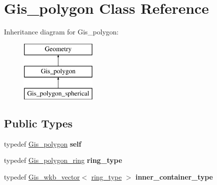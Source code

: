 \hypertarget{classGis__polygon}{}\section{Gis\+\_\+polygon Class Reference}
\label{classGis__polygon}
Inheritance diagram for Gis\+\_\+polygon\+:\begin{figure}[H]
\begin{center}
\leavevmode
\includegraphics[height=3.000000cm]{classGis__polygon}
\end{center}
\end{figure}
\subsection*{Public Types}
\begin{DoxyCompactItemize}
\item 
\mbox{\label{classGis__polygon_ac2a86535224cdabe48dcc9280184d664}} 
typedef \mbox{\hyperlink{classGis__polygon}{Gis\+\_\+polygon}} {\bfseries self}
\item 
\mbox{\label{classGis__polygon_a68d50982cd3fb522b91d9a62c0e540ca}} 
typedef \mbox{\hyperlink{classGis__polygon__ring}{Gis\+\_\+polygon\+\_\+ring}} {\bfseries ring\+\_\+type}
\item 
\mbox{\label{classGis__polygon_acd4d7dec322b7b9caf7cfe5d366f79e4}} 
typedef \mbox{\hyperlink{classGis__wkb__vector}{Gis\+\_\+wkb\+\_\+vector}}$<$ \mbox{\hyperlink{classGis__polygon__ring}{ring\+\_\+type}} $>$ {\bfseries inner\+\_\+container\+\_\+type}
\end{DoxyCompactItemize}
